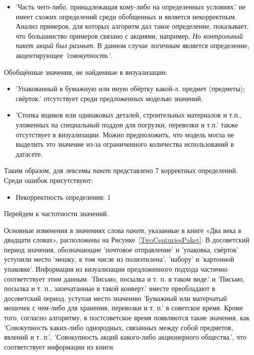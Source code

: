 \documentclass[LI,VKR]{HSEUniversity}
\begin{document}
\begin{itemize}
    \item ’Часть чего-либо, принадлежащая кому-либо на определенных условиях.’ не
имеет схожих определений среди обобщенных и является некорректным.
Анализ примеров, для которых алгоритм дал такое определение, показывает, что
большинство примеров связано с акциями, например, \textit{Но контрольный пакет акций был размыт}.
В данном случае логичным является определение, акцентирующее \textit{’совокупность’}.
\end{itemize}

Обобщённые значения, не найденные в визуализации:
\begin{itemize}
    \item ’Упакованный в бумажную или иную обёртку какой-л. предмет (предметы); свёрток.’
отсутствует среди предложенных моделью значений.

    \item ’Стопка ящиков или одинаковых деталей, строительных материалов и т.п.,
уложенных на специальный поддон для погрузки, перевозки и т.п.’
также отсутствует в визуализации.
Можно предположить, что модель могла не выделить это значение из-за ограниченного
количества использований в датасете.
\end{itemize}

Таким образом, для лексемы \textit{пакет} представлено 7 корректных определений.
Среди ошибок присутствуют:
\begin{itemize}
    \item Некорректность определения: 1
\end{itemize}

Перейдем к частотности значений.

Основные изменения в значениях слова \textit{пакет}, указанные в книге «Два века в двадцати словах»,
расположены на Рисунке~\ref{TwoCenturiesPaket}.
В досоветский период значения, обозначающие ’почтовое отправление’ и ’упаковка, свёрток’
уступили место ’мешку, в том числе из полиэтилена’, ’набору’ и ’картонной упаковке’.
Информация из визуализации предложенного подхода частично соответствует этим данным.
’Письмо, посылка и т. п. в таком виде.’ и ’Письмо, посылка и т. п., запечатанные в такой конверт.’
вместе преобладают в досоветский период, уступая место значению
’Бумажный или матерчатый мешочек с чем-либо для хранения, перевозки и т. п.’ в советское время.
Кроме того, согласно алгоритму, в постсоветское время появляются такие значения, как
’Совокупность каких-либо однородных, связанных между собой предметов, явлений и т. п.’,
’Совокупность акций какого-либо акционерного общества.’,
что соответствует информации из книги.
\end{document}
